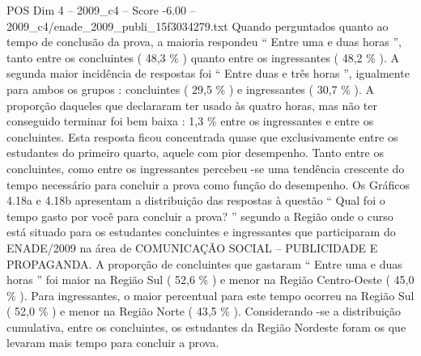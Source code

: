 \begin{textsample}{POS Dim 4 – 2009\_c4 – Score -6.00 – 2009\_c4/enade\_2009\_publi\_15f3034279.txt}
Quando perguntados quanto ao tempo de conclusão da prova, a maioria respondeu “ Entre uma e duas horas ”, tanto entre os concluintes ( 48,3 \% ) quanto entre os ingressantes ( 48,2 \% ).
A segunda maior incidência de respostas foi “ Entre duas e três horas ”, igualmente para ambos os grupos : concluintes ( 29,5 \% ) e ingressantes ( 30,7 \% ).
A proporção daqueles que declararam ter usado às quatro horas, mas não ter conseguido terminar foi bem baixa : 1,3 \% entre os ingressantes e entre os concluintes.
Esta resposta ficou concentrada quase que exclusivamente entre os estudantes do primeiro quarto, aquele com pior desempenho.
Tanto entre os concluintes, como entre os ingressantes percebeu -se uma tendência crescente do tempo necessário para concluir a prova como função do desempenho.
Os Gráficos 4.18a e 4.18b apresentam a distribuição das respostas à questão “ Qual foi o tempo gasto por você para concluir a prova? ” segundo a Região onde o curso está situado para os estudantes concluintes e ingressantes que participaram do ENADE/2009 na área de COMUNICAÇÃO SOCIAL – PUBLICIDADE E PROPAGANDA.
A proporção de concluintes que gastaram “ Entre uma e duas horas ” foi maior na Região Sul ( 52,6 \% ) e menor na Região Centro-Oeste ( 45,0 \% ).
Para ingressantes, o maior percentual para este tempo ocorreu na Região Sul ( 52,0 \% ) e menor na Região Norte ( 43,5 \% ).
Considerando -se a distribuição cumulativa, entre os concluintes, os estudantes da Região Nordeste foram os que levaram mais tempo para concluir a prova.

\end{textsample}
